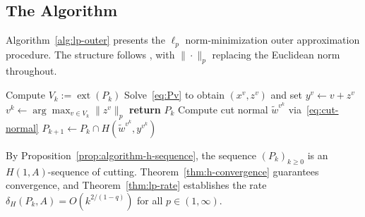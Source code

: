 \documentclass[11pt]{article}
\DeclareMathOperator{\ext}{ext}
\begin{document}
\subsection{The Algorithm}\label{sec:algorithm-description}

Algorithm~\ref{alg:lp-outer} presents the $\ell_p$ norm-minimization outer approximation procedure. The structure follows \cite[Algorithm~1]{Ararat2024}, with $\|\cdot\|_p$ replacing the Euclidean norm throughout.

\begin{algorithm}[H]
\caption{$\ell_p$ Norm-Minimization Outer Approximation}\label{alg:lp-outer}
\begin{algorithmic}[1]
    \State Compute $V_k := \ext(P_k)$ 
        \State Solve~\eqref{eq:Pv} to obtain $(x^v, z^v)$ and set $y^v \gets v + z^v$
    \EndFor
    \State $v^k \gets \arg\max_{v \in V_k} \|z^v\|_p$ 
        \State \textbf{return} $P_k$ 
    \EndIf
    \State Compute cut normal $\tilde{w}^{v^k}$ via~\eqref{eq:cut-normal}
    \State $P_{k+1} \gets P_k \cap H(\tilde{w}^{v^k}, y^{v^k})$ 
\EndFor
{}
\end{algorithmic}
\end{algorithm}

By Proposition~\ref{prop:algorithm-h-sequence}, the sequence $(P_k)_{k \ge 0}$ is an $H(1,A)$-sequence of cutting. Theorem~\ref{thm:h-convergence} guarantees convergence, and Theorem~\ref{thm:lp-rate} establishes the rate $\delta_H(P_k, A) = O(k^{2/(1-q)})$ for all $p \in (1,\infty)$.
\end{document}
